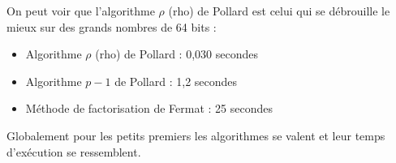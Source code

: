 \documentclass[a4paper, 12pt]{article}
\begin{document}
On peut voir que l'algorithme $\rho$ (rho) de Pollard est celui qui se débrouille le mieux sur des grands nombres de 64 bits :

\begin{itemize}[label=\textbullet]
    \item {Algorithme $\rho$ (rho) de Pollard} : 0,030 secondes
    \item {Algorithme $p - 1$ de Pollard} : 1,2 secondes
    \item {Méthode de factorisation de Fermat : 25 secondes}
\end{itemize}
\bigskip

Globalement pour les petits premiers les algorithmes se valent et leur temps d'exécution se ressemblent.
\end{document}
